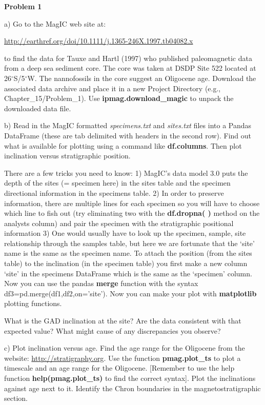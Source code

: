 {\parindent 0pt  \parskip 6pt

{\bf Problem 1 }

a) Go to the MagIC web site at: 

\url{http://earthref.org/doi/10.1111/j.1365-246X.1997.tb04082.x}

 to find the data for Tauxe and Hartl (1997) \nocite{tauxe97} who published paleomagnetic data from a deep sea sediment core.   The core was taken at DSDP Site 522 located at  26$^{\circ}$S/5$^{\circ}$W.  The nannofossils in the core suggest an Oligocene age.   Download the associated data  archive and place it in a new Project Directory (e.g., Chapter\_15/Problem\_1).  Use {\bf ipmag.download\_magic} to  unpack the   downloaded data file.   


b) Read in the MagIC formatted {\it specimens.txt} and {\it sites.txt}  files into a Pandas DataFrame  (these are tab delimited with headers in the second row).   Find out what is available for plotting using a  command like {\bf df.columns}.  Then plot inclination versus stratigraphic position.  

There are a few tricks you need to know:  1) MagIC's data model 3.0 puts the depth of the sites (= specimen here) in the sites table and the specimen directional information in the specimens table.  2) In order to preserve information, there are multiple lines for each specimen so you will have to choose which line to fish out (try eliminating two with the {\bf df.dropna( )} method on the analysts column) and  pair the specimen with the stratigraphic positional information   3) One would usually have to look up the specimen, sample, site relationship through the samples table, but here we are fortunate that the `site' name is the same as the specimen name.  To attach the position (from the sites table) to the inclination (in the specimen table)  you first make a new column `site' in the specimens DataFrame which is the same as the `specimen'  column.  Now you can use the pandas {\bf merge} function with the syntax df3=pd.merge(df1,df2,on='site'). 
Now you can make your plot with {\bf matplotlib} plotting functions.    

 What is the GAD inclination at the site?    Are the data consistent with that expected value?   What might cause of any discrepancies you observe?    

c) Plot inclination versus age.  
 Find the age range for the Oligocene from the website: \url{http://stratigraphy.org}.  Use  the function  {\bf  pmag.plot\_ts}   to plot a timescale and an age range for the Oligocene. [Remember to use the help function {\bf help(pmag.plot\_ts)} to find the correct syntax]. Plot the inclinations  against age next to it.      Identify the Chron boundaries in the magnetostratigraphic section.   

}
